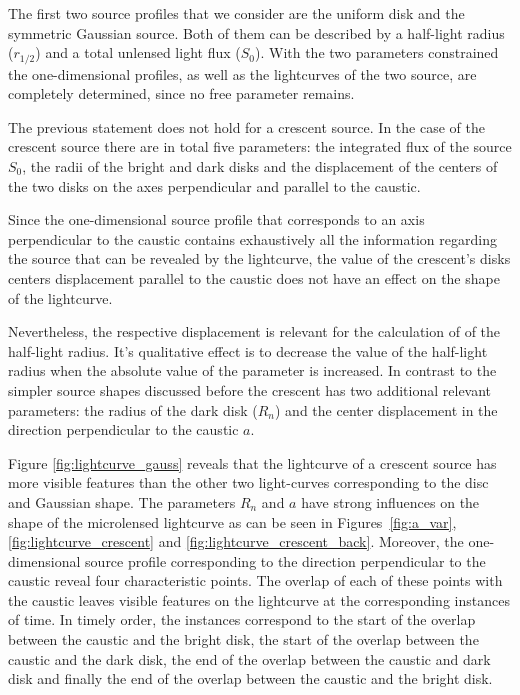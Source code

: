 \documentclass[usenatbib]{mn2e}
\begin{document}
The first two source profiles that we consider are the uniform disk and the symmetric Gaussian source. 
Both of them can be described by a half-light radius ($r_{1/2}$) and a total unlensed light flux ($S_0$). 
With the two parameters constrained the one-dimensional profiles, as well as the lightcurves of the 
two source, are completely determined, since no free parameter remains. 

The previous statement does not hold for a crescent source.
In the case of the crescent source there are in total five parameters: the integrated flux of the source $S_0$,
 the radii of the bright and dark disks and the displacement of the centers of the two disks on the axes perpendicular and parallel to the caustic. 


Since the one-dimensional source profile that corresponds to an 
axis perpendicular to the caustic contains exhaustively all the 
information regarding the source that can be revealed by the lightcurve, 
the value of the crescent's disks centers displacement parallel to the caustic 
does not have an effect on the shape of the lightcurve. 

Nevertheless, the respective displacement is relevant for the calculation of
of the half-light radius.  It's qualitative effect is to 
decrease the value of the
half-light radius when the absolute value of the parameter is
increased.  In contrast to the simpler source shapes discussed before the
crescent has two additional relevant parameters: the radius of the dark 
disk ($R_n$) and the center displacement in the direction
 perpendicular to the caustic $a$.

Figure \ref{fig:lightcurve_gauss} reveals that the lightcurve of a crescent source has more
visible features than the other two light-curves corresponding to the
disc and Gaussian shape. The parameters $R_n$ and $a$ have strong
influences on the shape of the microlensed lightcurve as can be seen
in Figures~\ref{fig:a_var}, \ref{fig:lightcurve_crescent} and
\ref{fig:lightcurve_crescent_back}.  Moreover, the one-dimensional
source profile corresponding to the direction perpendicular to the
caustic reveal four characteristic points. The overlap of each of
these points with the caustic leaves visible features on the
lightcurve at the corresponding instances of time. In timely order,
the instances correspond to the start of the overlap between the
caustic and the bright disk, the start of the overlap between the
caustic and the dark disk, the end of the overlap between the caustic
and dark disk and finally the end of the overlap between the caustic
and the bright disk.
\end{document}
